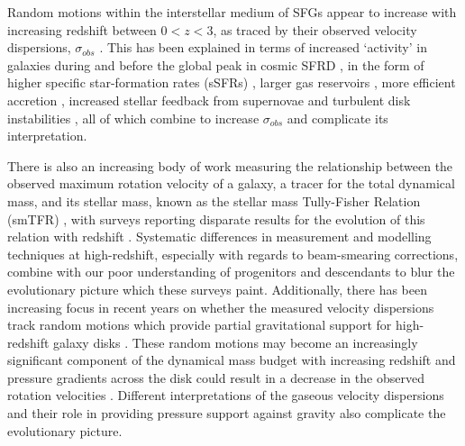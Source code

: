 \documentclass[fleqn,usenatbib]{mnras}
\begin{document}
Random motions within the interstellar medium of SFGs appear to increase with increasing redshift between $0 < z < 3$, as traced by their observed velocity dispersions, $\sigma_{obs}$ \citep{Genzel2008,ForsterSchreiber2009,Law2009,Cresci2009,Gnerucci2011,Epinat2012,Kassin2012,Green2014,Wisnioski2015,Stott2016}.
This has been explained in terms of increased `activity' in galaxies during and before the global peak in cosmic SFRD \citep{Madau_2014}, in the form of higher specific star-formation rates (sSFRs) \citep{Wisnioski2015}, larger gas reservoirs \citep{Law2009,ForsterSchreiber2009,Wisnioski2015,Stott2016}, more efficient accretion \citep{Law2009}, increased stellar feedback from supernovae \citep{Kassin2012} and turbulent disk instabilities \citep{Law2009,Bournaud2007,Bournaud2016}, all of which combine to increase $\sigma_{obs}$ and complicate its interpretation.

There is also an increasing body of work measuring the relationship between the observed maximum rotation velocity of a galaxy, a tracer for the total dynamical mass, and its stellar mass, known as the stellar mass Tully-Fisher Relation (smTFR) \citep{Tully1977}, with surveys reporting disparate results for the evolution of this relation with redshift \citep[e.g.][]{Puech2008,Miller2011,Gnerucci2011,Swinbank2012,Simons2016,Tiley2016,Harrison2017,Straatman2017,Ubler2017}.
Systematic differences in measurement and modelling techniques at high-redshift, especially with regards to beam-smearing corrections, combine with our poor understanding of progenitors and descendants to blur the evolutionary picture which these surveys paint.
Additionally, there has been increasing focus in recent years on whether the measured velocity dispersions track random motions which provide partial gravitational support for high-redshift galaxy disks \citep[e.g.][]{Burkert2010,Wuyts2016b,Ubler2017,Genzel2017,Lang2017}.
These random motions may become an increasingly significant component of the dynamical mass budget with increasing redshift \citep{Wuyts2016b} and pressure gradients across the disk could result in a decrease in the observed rotation velocities \citep{Burkert2010}. 
Different interpretations of the gaseous velocity dispersions and their role in providing pressure support against gravity also complicate the evolutionary picture. \\
\end{document}
